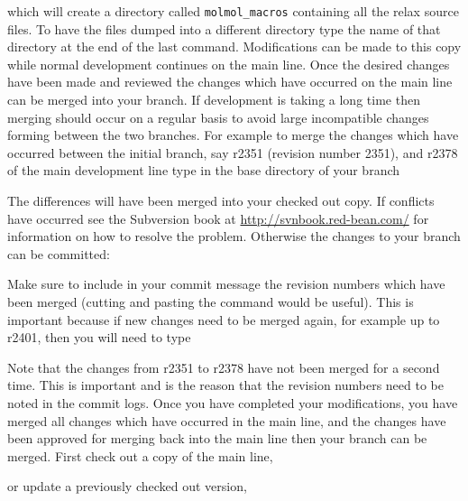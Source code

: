 which will create a directory called \texttt{molmol\_macros} containing all the relax source files.  To have the files dumped into a different directory type the name of that directory at the end of the last command.  Modifications can be made to this copy while normal development continues on the main line.  Once the desired changes have been made and reviewed the changes which have occurred on the main line can be merged into your branch.  If development is taking a long time then merging should occur on a regular basis to avoid large incompatible changes forming between the two branches.  For example to merge the changes which have occurred between the initial branch, say r2351 (revision number 2351), and r2378 of the main development line type in the base directory of your branch


The differences will have been merged into your checked out copy.  If conflicts have occurred see the Subversion book at \href{http://svnbook.red-bean.com/}{http://svnbook.red-bean.com/} for information on how to resolve the problem.  Otherwise the changes to your branch can be committed:


Make sure to include in your commit message the revision numbers which have been merged (cutting and pasting the command would be useful).  This is important because if new changes need to be merged again, for example up to r2401, then you will need to type


Note that the changes from r2351 to r2378 have not been merged for a second time.  This is important and is the reason that the revision numbers need to be noted in the commit logs.  Once you have completed your modifications, you have merged all changes which have occurred in the main line, and the changes have been approved for merging back into the main line then your branch can be merged.  First check out a copy of the main line,


or update a previously checked out version,

